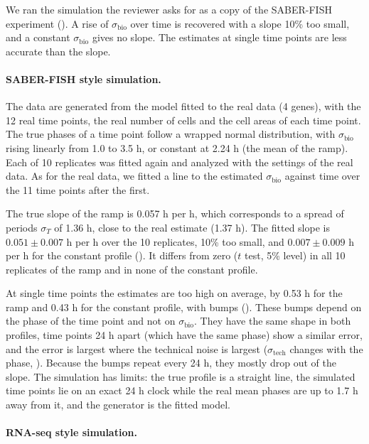 We ran the simulation the reviewer asks for as a copy of the SABER-FISH experiment (). A rise of $\sigma_{\text{bio}}$ over time is recovered with a slope 10\% too small, and a constant $\sigma_{\text{bio}}$ gives no slope. The estimates at single time points are less accurate than the slope.

\paragraph{SABER-FISH style simulation.}

The data are generated from the model fitted to the real data (4 genes), with the 12 real time points, the real number of cells and the cell areas of each time point. The true phases of a time point follow a wrapped normal distribution, with $\sigma_{\text{bio}}$ rising linearly from 1.0 to 3.5 h, or constant at 2.24 h (the mean of the ramp). Each of 10 replicates was fitted again and analyzed with the settings of the real data. As for the real data, we fitted a line to the estimated $\sigma_{\text{bio}}$ against time over the 11 time points after the first.

The true slope of the ramp is 0.057 h per h, which corresponds to a spread of periods $\sigma_T$ of 1.36 h, close to the real estimate (1.37 h). The fitted slope is $0.051 \pm 0.007$ h per h over the 10 replicates, 10\% too small, and $0.007 \pm 0.009$ h per h for the constant profile (). It differs from zero ($t$ test, 5\% level) in all 10 replicates of the ramp and in none of the constant profile.

At single time points the estimates are too high on average, by 0.53 h for the ramp and 0.43 h for the constant profile, with bumps (). These bumps depend on the phase of the time point and not on $\sigma_{\text{bio}}$. They have the same shape in both profiles, time points 24 h apart (which have the same phase) show a similar error, and the error is largest where the technical noise is largest ($\sigma_{\text{tech}}$ changes with the phase, ). Because the bumps repeat every 24 h, they mostly drop out of the slope. The simulation has limits: the true profile is a straight line, the simulated time points lie on an exact 24 h clock while the real mean phases are up to 1.7 h away from it, and the generator is the fitted model.

\paragraph{RNA-seq style simulation.}

